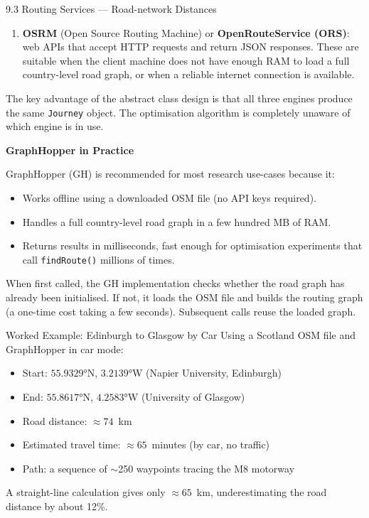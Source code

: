 \documentclass[aspectratio=169,10pt]{beamer}
\begin{document}
\begin{frame}[allowframebreaks]{9.3 Routing Services --- Road-network Distances}
\begin{enumerate}
    \item \textbf{OSRM} (Open Source Routing Machine) or
          \textbf{OpenRouteService (ORS)}: web APIs that accept HTTP requests
          and return JSON responses.  These are suitable when the client
          machine does not have enough RAM to load a full country-level road
          graph, or when a reliable internet connection is available.
  \end{enumerate}

  The key advantage of the abstract class design is that all three engines
  produce the same \texttt{Journey} object.  The optimisation algorithm
  is completely unaware of which engine is in use.

  \framebreak

  \textbf{GraphHopper in Practice}

  \medskip
  GraphHopper (GH) is recommended for most research use-cases because it:
  \begin{itemize}
    \item Works offline using a downloaded OSM file (no API keys required).
    \item Handles a full country-level road graph in a few hundred MB of RAM.
    \item Returns results in milliseconds, fast enough for optimisation
          experiments that call \texttt{findRoute()} millions of times.
  \end{itemize}

  When first called, the GH implementation checks whether the road graph
  has already been initialised.  If not, it loads the OSM file and builds
  the routing graph (a one-time cost taking a few seconds).  Subsequent
  calls reuse the loaded graph.

  \begin{exampleblock}{Worked Example: Edinburgh to Glasgow by Car}
    Using a Scotland OSM file and GraphHopper in car mode:
    \begin{itemize}
      \item Start: $55.9329°$N, $3.2139°$W (Napier University, Edinburgh)
      \item End: $55.8617°$N, $4.2583°$W (University of Glasgow)
      \item Road distance: $\approx 74$~km
      \item Estimated travel time: $\approx 65$~minutes (by car, no traffic)
      \item Path: a sequence of $\sim$250 waypoints tracing the M8 motorway
    \end{itemize}
    A straight-line calculation gives only $\approx 65$~km, underestimating
    the road distance by about 12\%.
  \end{exampleblock}

\end{frame}
\end{document}
